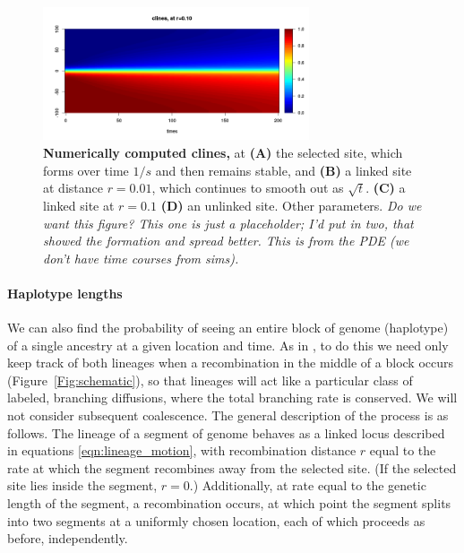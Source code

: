 \documentclass[12pt]{article}
\newcommand{\plr}[1]{{\em \color{blue} #1}}
\begin{document}
\begin{figure}
    \begin{center}
       \includegraphics[width=0.7\textwidth]{figs/example_cline}
    \end{center}
    \caption{
        \textbf{Numerically computed clines,} at
        \textbf{(A)} the selected site, which forms over time $1/s$ and then remains stable, and
        \textbf{(B)} a linked site at distance $r=0.01$, which continues to smooth out as $\sqrt{t}$.
        \textbf{(C)} a linked site at $r=0.1$
        \textbf{(D)} an unlinked site.
        Other parameters.
       \plr{Do we want this figure? This one is just a placeholder; I'd put in two, that showed the formation and spread better.
       This is from the PDE (we don't have time courses from sims).}
        \label{fig:pde_clines}
    }
\end{figure}


\paragraph{Haplotype lengths}
We can also find the probability of seeing an entire block of genome (haplotype)
of a single ancestry at a given location and time.
As in \citet{Sedghifar2015},
to do this we need only keep track of both lineages when a recombination in the middle of a block occurs (Figure~\ref{Fig:schematic}),
so that lineages will act like a particular class of labeled, branching diffusions,
where the total branching rate is conserved.
We will not consider subsequent coalescence.
The general description of the process is as follows.
The lineage of a segment of genome behaves as a linked locus described in equations \eqref{eqn:lineage_motion},
with recombination distance $r$ equal to the rate at which the segment recombines away from the selected site.
(If the selected site lies inside the segment, $r=0$.)
Additionally, at rate equal to the genetic length of the segment,
a recombination occurs, at which point the segment splits into two segments at a uniformly chosen location,
each of which proceeds as before, independently.
\end{document}
